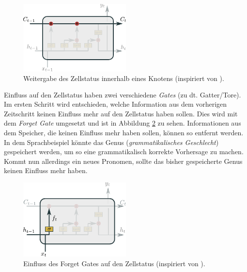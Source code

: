             \begin{figure}[ht]
                \centering
                \includegraphics[width=0.5\textwidth]{images/Illustrationen/LSTM_MC}
                \caption{Weitergabe des Zellstatus innerhalb eines Knotens (inspiriert von \cite{OLAH2015}).}
                \label{fig:LSTM_Status}
            \end{figure}
            
        Einfluss auf den Zellstatus haben zwei verschiedene \textit{Gates} (zu dt. Gatter/Tore).
        Im ersten Schritt wird entschieden, welche Information aus dem vorherigen Zeitschritt keinen Einfluss mehr auf den Zellstatus haben sollen.
        Dies wird mit dem \textit{Forget Gate} umgesetzt und ist in Abbildung \ref{fig:LSTM_Forget} zu sehen.
        Informationen aus dem Speicher, die keinen Einfluss mehr haben sollen, können so entfernt werden.
        In dem Sprachbeispiel könnte das Genus (\textit{grammatikalisches Geschlecht}) gespeichert werden, um so eine grammatikalisch korrekte Vorhersage zu machen.
        Kommt nun allerdings ein neues Pronomen, sollte das bisher gespeicherte Genus keinen Einfluss mehr haben.
            \begin{figure}[ht]
                \centering
                \includegraphics[width=0.5\textwidth]{images/Illustrationen/LSTM_FG}
                \caption{Einfluss des Forget Gates auf den Zellstatus (inspiriert von \cite{OLAH2015}).}
                \label{fig:LSTM_Forget}
            \end{figure}
            
